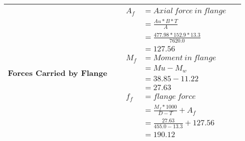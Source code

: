 \documentclass{article}%
\begin{document}
\begin{longtable}{|p{4cm}|p{5cm}|p{5.5cm}|p{1.5cm}|}
\hline%
Forces Carried by Flange&&$\begin{aligned} A_f&= Axial~force~ in ~flange  \\ &= \frac{Au * B *T}{A} \\ &= \frac{477.98 * 152.9*13.3}{7620.0} \\ &=127.56\\ M_f& =Moment~ in~ flange \\  & = Mu-M_w\\ &= 38.85-11.22\\ &=27.63\\  f_f& =flange~force  \\ & = \frac{M_f *1000}{D-T} + A_f \\ &= \frac{27.63}{455.0-13.3} +127.56 \\ &=190.12\end{aligned}$&\\%
\hline%
\end{longtable}

%
\end{document}
